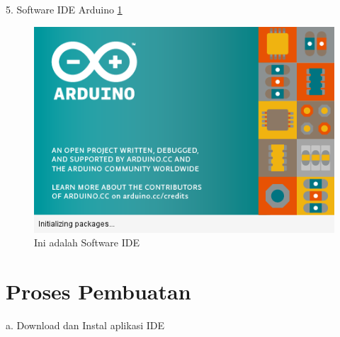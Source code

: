 \documentclass{article}
\begin{document}
 5. Software IDE Arduino
 \ref{ide}
  \begin{figure}[ht]
  \centerline{\includegraphics[width=1\textwidth]{../figures/ide.png}}
  \caption{Ini adalah Software IDE}
  \label{ide}
  \end{figure}


\section{Proses Pembuatan}

 a. Download dan Instal aplikasi IDE 
\end{document}
